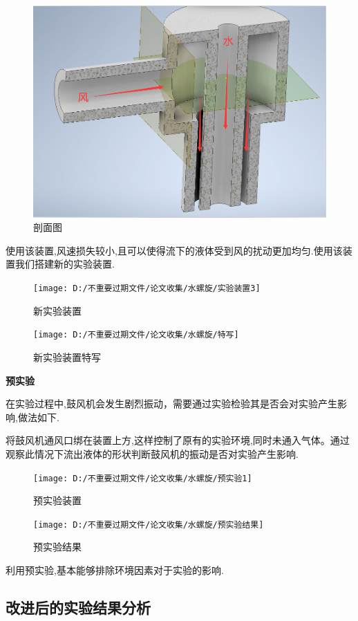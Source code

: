 \documentclass[UTF8]{gapd}
\begin{document}
\begin{figure}[H]
	\centering
	\includegraphics[width=0.8\linewidth]{images/剖面图}
	\caption{剖面图}
	\label{fig:P2}
\end{figure}

使用该装置,风速损失较小,且可以使得流下的液体受到风的扰动更加均匀.使用该装置我们搭建新的实验装置.
\begin{figure}[H]
	\centering
	\texttt{[image: D:/不重要过期文件/论文收集/水螺旋/实验装置3]}
	\caption{新实验装置}
	\label{fig:P2}
\end{figure}
\begin{figure}[H]
	\centering
	\texttt{[image: D:/不重要过期文件/论文收集/水螺旋/特写]}
	\caption{新实验装置特写}
	\label{fig:P2}
\end{figure}

\textbf{预实验}

在实验过程中,鼓风机会发生剧烈振动，需要通过实验检验其是否会对实验产生影响,做法如下.

将鼓风机通风口绑在装置上方,这样控制了原有的实验环境,同时未通入气体。通过观察此情况下流出液体的形状判断鼓风机的振动是否对实验产生影响. 

\begin{figure}[H]
	\centering
	\texttt{[image: D:/不重要过期文件/论文收集/水螺旋/预实验1]}
	\caption{预实验装置}
	\label{fig:P2}
\end{figure}
\begin{figure}[H]
	\centering
	\texttt{[image: D:/不重要过期文件/论文收集/水螺旋/预实验结果]}
	\caption{预实验结果}
	\label{fig:P2}
\end{figure}

利用预实验,基本能够排除环境因素对于实验的影响.

\subsection{改进后的实验结果分析}
\end{document}
